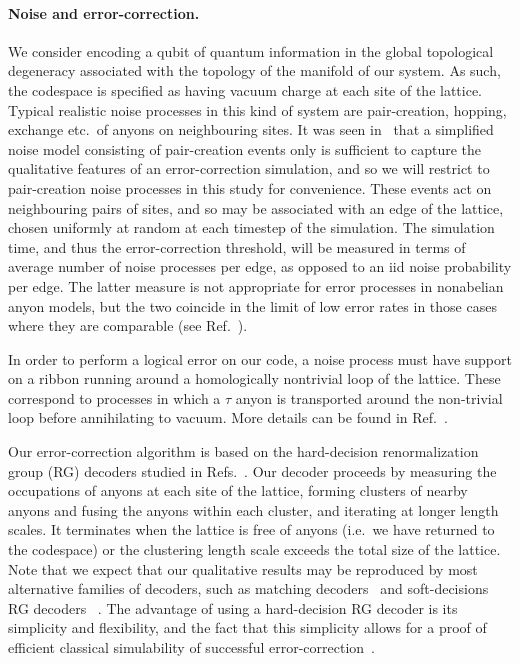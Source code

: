 \documentclass[aps, prl, letterpaper, twocolumn, superscriptaddress, notitlepage, 10pt]{revtex4-1}
\begin{document}
\paragraph{Noise and error-correction.}

	We consider encoding a qubit of quantum information in the global topological degeneracy associated with the topology of the manifold of our system. As such, the codespace is specified as having vacuum charge at each site of the lattice. Typical realistic noise processes in this kind of system are pair-creation, hopping, exchange etc.~of anyons on neighbouring sites. It was seen in~\cite{Brell2013} that a simplified noise model consisting of pair-creation events only is sufficient to capture the qualitative features of an error-correction simulation, and so we will restrict to pair-creation noise processes in this study for convenience. These events act on neighbouring pairs of sites, and so may be associated with an edge of the lattice, chosen uniformly at random at each timestep of the simulation. The simulation time, and thus the error-correction threshold, will be measured in terms of average number of noise processes per edge, as opposed to an iid noise probability per edge. The latter measure is not appropriate for error processes in nonabelian anyon models, but the two coincide in the limit of low error rates in those cases where they are comparable (see Ref.~\cite{Brell2013}).

	In order to perform a logical error on our code, a noise process must have support on a ribbon running around a homologically nontrivial loop of the lattice. These correspond to processes in which a $\tau$ anyon is transported around the non-trivial loop before annihilating to vacuum. More details can be found in Ref.~\cite{?}.

	Our error-correction algorithm is based on the hard-decision renormalization group (RG) decoders studied in Refs.~\cite{?}. Our decoder proceeds by measuring the occupations of anyons at each site of the lattice, forming clusters of nearby anyons and fusing the anyons within each cluster, and iterating at longer length scales. It terminates when the lattice is free of anyons (i.e.~we have returned to the codespace) or the clustering length scale exceeds the total size of the lattice.   Note that we expect that our qualitative results may be reproduced by most alternative families of decoders, such as matching decoders~\cite{?} and soft-decisions RG decoders~\cite{?} . The advantage of using a hard-decision RG decoder is its simplicity and flexibility, and the fact that this simplicity allows for a proof of efficient classical simulability of successful error-correction~\cite{RGsim}.
	
\end{document}
